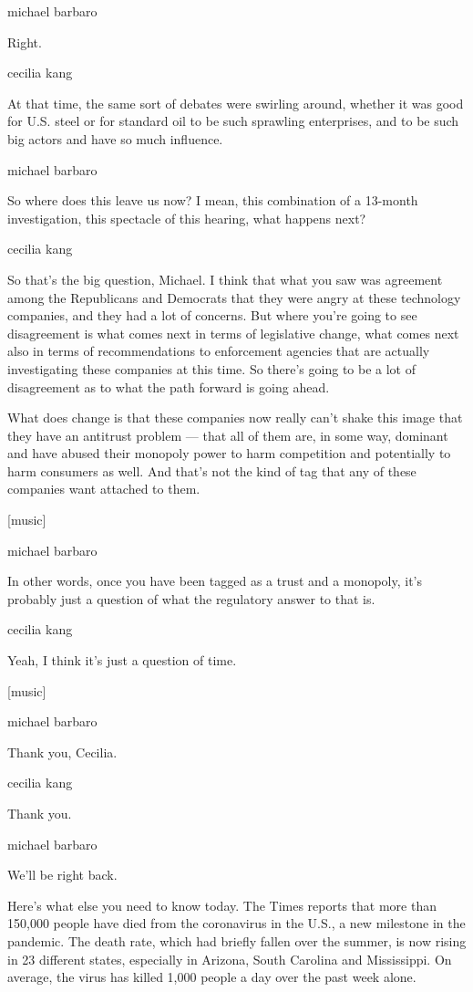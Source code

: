 michael barbaro

Right.

cecilia kang

At that time, the same sort of debates were swirling around, whether it
was good for U.S. steel or for standard oil to be such sprawling
enterprises, and to be such big actors and have so much influence.

michael barbaro

So where does this leave us now? I mean, this combination of a 13-month
investigation, this spectacle of this hearing, what happens next?

cecilia kang

So that's the big question, Michael. I think that what you saw was
agreement among the Republicans and Democrats that they were angry at
these technology companies, and they had a lot of concerns. But where
you're going to see disagreement is what comes next in terms of
legislative change, what comes next also in terms of recommendations to
enforcement agencies that are actually investigating these companies at
this time. So there's going to be a lot of disagreement as to what the
path forward is going ahead.

What does change is that these companies now really can't shake this
image that they have an antitrust problem --- that all of them are, in
some way, dominant and have abused their monopoly power to harm
competition and potentially to harm consumers as well. And that's not
the kind of tag that any of these companies want attached to them.

{[}music{]}

michael barbaro

In other words, once you have been tagged as a trust and a monopoly,
it's probably just a question of what the regulatory answer to that is.

cecilia kang

Yeah, I think it's just a question of time.

{[}music{]}

michael barbaro

Thank you, Cecilia.

cecilia kang

Thank you.

michael barbaro

We'll be right back.

Here's what else you need to know today. The Times reports that more
than 150,000 people have died from the coronavirus in the U.S., a new
milestone in the pandemic. The death rate, which had briefly fallen over
the summer, is now rising in 23 different states, especially in Arizona,
South Carolina and Mississippi. On average, the virus has killed 1,000
people a day over the past week alone.

